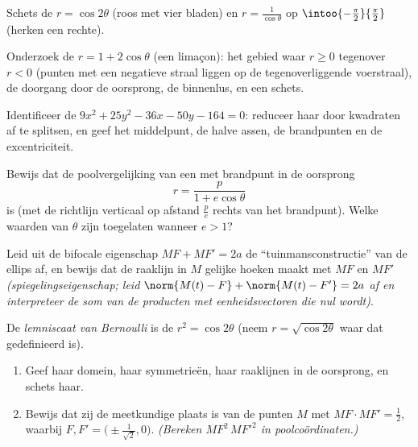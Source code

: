 \begin{exercise}[$\star$]\label{exo:b1:curves:4}
Schets de  $r = \cos 2\theta$ (roos met vier bladen) en
$r = \frac{1}{\cos\theta}$ op $\intoo{-\frac\pi2}{\frac\pi2}$
(herken een rechte).
\end{exercise}

\begin{exercise}[$\star\star$]\label{exo:b1:curves:5}
Onderzoek de  $r = 1 + 2\cos\theta$ (een limaçon): het
gebied waar $r \geq 0$ tegenover $r < 0$ (punten met een negatieve
straal liggen op de tegenoverliggende voerstraal), de doorgang door
de oorsprong, de binnenlus, en een schets.
\end{exercise}

\begin{exercise}[$\star\star$]\label{exo:b1:curves:6}
Identificeer de  $9x^2 + 25y^2 - 36x - 50y - 164 = 0$:
reduceer haar door kwadraten af te splitsen, en geef het
middelpunt, de halve assen, de brandpunten en de excentriciteit.
\end{exercise}

\begin{exercise}[$\star\star$]\label{exo:b1:curves:7}
Bewijs dat de poolvergelijking van een  met brandpunt in
de oorsprong
\[
r = \frac{p}{1 + e\cos\theta}
\]
is (met de richtlijn verticaal op afstand $\frac pe$ rechts van het
brandpunt). Welke waarden van $\theta$ zijn toegelaten wanneer $e >
1$?
\end{exercise}

\begin{exercise}[$\star\star$]\label{exo:b1:curves:8}
Leid uit de bifocale eigenschap $MF + MF' = 2a$ de
``tuinmansconstructie'' van de ellips af, en bewijs dat de raaklijn
in $M$ gelijke hoeken maakt met $MF$ en $MF'$
\emph{(spiegelingseigenschap; leid $\norm{M(t) - F} + \norm{M(t) -
F'} = 2a$ af en interpreteer de som van de producten met
eenheidsvectoren die nul wordt)}.
\end{exercise}

\begin{exercise}[$\star\star\star$]\label{exo:b1:curves:9}
De \emph{lemniscaat van Bernoulli} is de  $r^2 = \cos
2\theta$ (neem $r = \sqrt{\cos2\theta}$ waar dat gedefinieerd is).
\begin{enumerate}
  \item Geef haar domein, haar symmetrieën, haar raaklijnen in de
        oorsprong, en schets haar.
  \item Bewijs dat zij de meetkundige plaats is van de punten $M$
        met $MF \cdot MF' = \frac12$, waarbij $F, F' =
        \bigl(\pm\frac{1}{\sqrt2}, 0\bigr)$. \emph{(Bereken
        $MF^2\,MF'^2$ in poolcoördinaten.)}
\end{enumerate}
\end{exercise}

